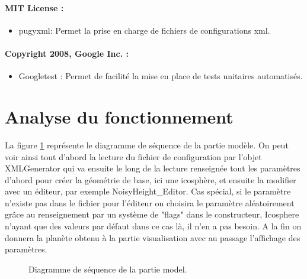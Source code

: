 \documentclass[a4paper]{article}
\begin{document}
\paragraph{MIT License :}
\begin{itemize}
\item pugyxml:
    Permet la prise en charge de fichiers de configurations xml.
\end{itemize}

\paragraph{Copyright 2008, Google Inc. :}
\begin{itemize}
\item Googletest :
    Permet de facilité la mise en place de tests unitaires automatisés. 
\end{itemize}

\newpage 
\section{Analyse du fonctionnement}

La figure \ref{seqmodel} représente le diagramme de séquence de la partie modèle. 
On peut voir ainsi tout d'abord la lecture du fichier de configuration par l'objet XMLGenerator qui va ensuite le long de la lecture renseignée tout les paramètres d'abord pour créer la géométrie de base, ici une icosphère, et ensuite la modifier avec un éditeur, par exemple NoisyHeight\_Editor. Cas spécial, si le paramètre n'existe pas dans le fichier pour l'éditeur on choisira le paramètre aléatoirement grâce au renseignement par un système de "flags" dans le constructeur, Icosphere n'ayant que des valeurs par défaut dans ce cas là, il n'en a pas besoin. A la fin on donnera la planète obtenu à la partie visualisation avec au passage l'affichage des paramètres.\\

\begin{figure}[!h]
\centering
\caption{Diagramme de séquence de la partie model.}
\label{seqmodel}
\end{figure}
\end{document}
